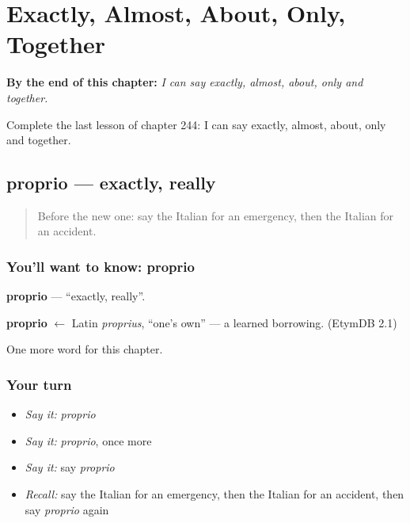 
\chapter{Exactly, Almost, About, Only, Together}
\label{ch:it-exactly-almost-about-only-together}

\begin{chapteropening}
\textbf{By the end of this chapter:} \emph{I can say exactly, almost, about, only and together.}

Complete the last lesson of chapter 244: I can say exactly, almost, about, only and together.
\end{chapteropening}

\section[proprio]{proprio — exactly, really}

\label{lesson:IT-C244-proprio}



\begin{quote}
Before the new one: say the Italian for an emergency, then the Italian for an accident.
\end{quote}

\subsection*{You'll want to know: proprio}
\textbf{proprio} — \textquotedblleft{}exactly, really\textquotedblright{}.

\begin{cousinweb}
\textbf{proprio} $\leftarrow$ Latin \emph{proprius}, \textquotedblleft{}one's own\textquotedblright{} — a learned borrowing. (EtymDB 2.1)
\end{cousinweb}

\begin{grammarlens}[title={What you've built}]
One more word for this chapter.
\end{grammarlens}

\subsection*{Your turn}
\begin{itemize}
\raggedright
  \item \emph{Say it:} \emph{proprio}
  \item \emph{Say it:} \emph{proprio}, once more
  \item \emph{Say it:} say \emph{proprio}
  \item \emph{Recall:} say the Italian for an emergency, then the Italian for an accident, then say \emph{proprio} again
\end{itemize}

